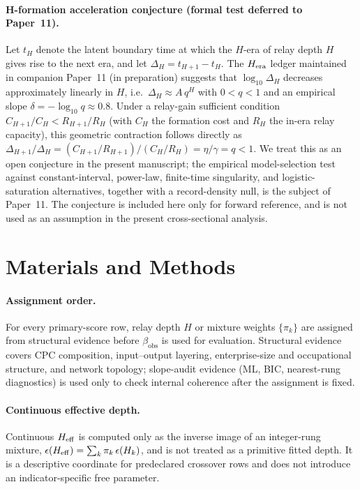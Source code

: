 \paragraph{H-formation acceleration conjecture (formal test deferred to Paper~11).}
Let $t_H$ denote the latent boundary time at which the $H$-era of relay depth $H$ gives rise to the next era, and let $\Delta_H = t_{H+1}-t_H$. The $H_{\rm era}$ ledger maintained in companion Paper~11 (in preparation) suggests that $\log_{10}\Delta_H$ decreases approximately linearly in $H$, i.e.\ $\Delta_H \approx A\,q^H$ with $0<q<1$ and an empirical slope $\delta = -\log_{10}q \approx 0.8$. Under a relay-gain sufficient condition $C_{H+1}/C_H < R_{H+1}/R_H$ (with $C_H$ the formation cost and $R_H$ the in-era relay capacity), this geometric contraction follows directly as $\Delta_{H+1}/\Delta_H = (C_{H+1}/R_{H+1})/(C_H/R_H) = \eta/\gamma = q<1$. We treat this as an open conjecture in the present manuscript; the empirical model-selection test against constant-interval, power-law, finite-time singularity, and logistic-saturation alternatives, together with a record-density null, is the subject of Paper~11. The conjecture is included here only for forward reference, and is not used as an assumption in the present cross-sectional analysis.

\section{Materials and Methods}

\paragraph{Assignment order.}
For every primary-score row, relay depth \(H\) or mixture weights
\(\{\pi_k\}\) are assigned from structural evidence before
\(\beta_{\mathrm{obs}}\) is used for evaluation.  Structural evidence covers
CPC composition, input--output layering, enterprise-size and occupational
structure, and network topology; slope-audit evidence (ML, BIC, nearest-rung
diagnostics) is used only to check internal coherence after the assignment
is fixed.

\paragraph{Continuous effective depth.}
Continuous \(H_{\mathrm{eff}}\) is computed only as the inverse image of an integer-rung
mixture, \(\epsilon(H_{\mathrm{eff}})=\sum_k\pi_k\,\epsilon(H_k)\), and is not treated
as a primitive fitted depth.  It is a descriptive coordinate for predeclared
crossover rows and does not introduce an indicator-specific free parameter.

